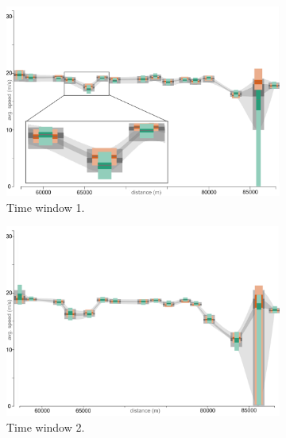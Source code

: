 \label{traffic_case_study}
\begin{figure}[h]
    \centering
    \begin{subfigure}{0.32\textwidth}
        \includegraphics[width=\textwidth]{images/sampling/timestep_a_samples_predicted.png}
        \caption{Time window 1.}
        \label{fig:a}
    \end{subfigure}
    \begin{subfigure}{0.32\textwidth}
        \includegraphics[width=\textwidth]{images/sampling/timestep_b_samples_predicted.png}
        \caption{Time window 2.}
        \label{fig:b}
    \end{subfigure}
    \begin{subfigure}{0.32\textwidth}

\end{subfigure}
\end{figure}
